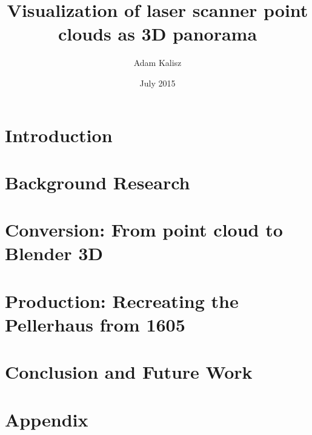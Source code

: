 \documentclass[12pt, oneside, titlepage]{book}
\title{Visualization of laser scanner point clouds as 3D panorama}
\author{Adam Kalisz}
\date{July 2015}
\begin{document}
	
	
	\thispagestyle{empty}
	
	\setcounter{page}{2}
	
	
	

	\pagestyle{plain}
	\tableofcontents
	
	
	\listoffigures
	\clearpage
	

	
	\chapter{Introduction}
	
	\chapter{Background Research}
	
	\chapter{Conversion: From point cloud to Blender 3D}
	
	\chapter{Production: Recreating the Pellerhaus from 1605}
	
	\chapter{Conclusion and Future Work}
		
	
	
	\appendix
	\chapter{Appendix}
	
	
	\printbibliography
	
	
		
\end{document}
